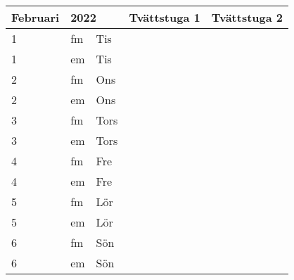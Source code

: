 \documentclass[a4paper]{article}
\begin{document}
\begin{table}[ht!]
\vspace{-10em}%
\normalsize
\begin{tabular}{lllp{7cm}p{7cm}}
\textbf{Februari}           & \multicolumn{2}{l}{\textbf{2022}}                  & \textbf{Tvättstuga 1} & \textbf{Tvättstuga 2} \\ \hline    

\multicolumn{1}{|l|}{1} & \multicolumn{1}{l|}{fm} & \multicolumn{1}{l|}{Tis} & \multicolumn{1}{l|}{} & \multicolumn{1}{l|}{} \\ \hline
\multicolumn{1}{|l|}{1} & \multicolumn{1}{l|}{em} & \multicolumn{1}{l|}{Tis} & \multicolumn{1}{l|}{} & \multicolumn{1}{l|}{} \\ \hline    

\multicolumn{1}{|l|}{2} & \multicolumn{1}{l|}{fm} & \multicolumn{1}{l|}{Ons} & \multicolumn{1}{l|}{} & \multicolumn{1}{l|}{} \\ \hline
\multicolumn{1}{|l|}{2} & \multicolumn{1}{l|}{em} & \multicolumn{1}{l|}{Ons} & \multicolumn{1}{l|}{} & \multicolumn{1}{l|}{} \\ \hline    

\multicolumn{1}{|l|}{3} & \multicolumn{1}{l|}{fm} & \multicolumn{1}{l|}{Tors} & \multicolumn{1}{l|}{} & \multicolumn{1}{l|}{} \\ \hline
\multicolumn{1}{|l|}{3} & \multicolumn{1}{l|}{em} & \multicolumn{1}{l|}{Tors} & \multicolumn{1}{l|}{} & \multicolumn{1}{l|}{} \\ \hline    

\multicolumn{1}{|l|}{4} & \multicolumn{1}{l|}{fm} & \multicolumn{1}{l|}{Fre} & \multicolumn{1}{l|}{} & \multicolumn{1}{l|}{} \\ \hline
\multicolumn{1}{|l|}{4} & \multicolumn{1}{l|}{em} & \multicolumn{1}{l|}{Fre} & \multicolumn{1}{l|}{} & \multicolumn{1}{l|}{} \\ \hline    

\multicolumn{1}{|l|}{5} & \multicolumn{1}{l|}{fm} & \multicolumn{1}{l|}{Lör} & \multicolumn{1}{l|}{} & \multicolumn{1}{l|}{} \\ \hline
\multicolumn{1}{|l|}{5} & \multicolumn{1}{l|}{em} & \multicolumn{1}{l|}{Lör} & \multicolumn{1}{l|}{} & \multicolumn{1}{l|}{} \\ \hline    

\multicolumn{1}{|l|}{6} & \multicolumn{1}{l|}{fm} & \multicolumn{1}{l|}{Sön} & \multicolumn{1}{l|}{} & \multicolumn{1}{l|}{} \\ \hline
\multicolumn{1}{|l|}{6} & \multicolumn{1}{l|}{em} & \multicolumn{1}{l|}{Sön} & \multicolumn{1}{l|}{} & \multicolumn{1}{l|}{} \\ \hline    


\end{tabular}
\end{table}
\end{document}
